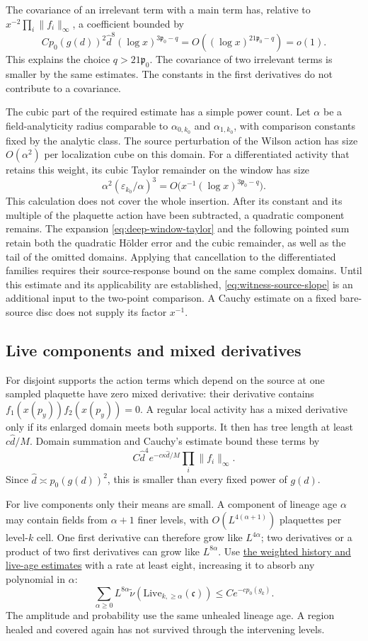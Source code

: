 \documentclass[11pt,letterpaper,reqno]{amsart}
\theoremstyle{definition}
\theoremstyle{remark}
\begin{document}
The covariance of an irrelevant term with a main term has, relative to
$x^{-2}\prod_i\|f_i\|_\infty$, a coefficient bounded by
\[
 Cp_0(g(d))^2\hat d^8(\log x)^{3\mathfrak p_0-q}
        =O((\log x)^{21\mathfrak p_0-q})=o(1).
\]
This explains the choice $q>21\mathfrak p_0$. The covariance of two
irrelevant terms is smaller by the same estimates. The constants in
the first derivatives do not contribute to a covariance.

The cubic part of the required estimate has a simple power count.
Let $\alpha$ be a field-analyticity radius comparable to
$\alpha_{0,k_0}$ and $\alpha_{1,k_0}$, with comparison constants
fixed by the analytic class. The source perturbation of the Wilson
action has size $O(\alpha^2)$ per localization cube on this domain.
For a differentiated activity that retains this weight, its cubic
Taylor remainder on the window has size
\[
 \alpha^2(\varepsilon_{k_0}/\alpha)^3
       =O\bigl(x^{-1}(\log x)^{3\mathfrak p_0-q}\bigr).
\]
This calculation does not cover the whole insertion. After its
constant and its multiple of the plaquette action have been
subtracted, a quadratic component remains. The expansion
\eqref{eq:deep-window-taylor} and the following pointed sum retain
both the quadratic H\"older error and the cubic remainder, as well
as the tail of the omitted domains.
Applying that cancellation to the differentiated families requires
their source-response bound on the same complex domains.
Until this estimate and its applicability are established,
\eqref{eq:witness-source-slope} is an additional input to the
two-point comparison. A Cauchy estimate on a fixed bare-source
disc does not supply its factor $x^{-1}$.

\subsection{Live components and mixed derivatives}

For disjoint supports the action terms which depend on the source at
one sampled plaquette have zero mixed derivative: their derivative
contains $f_1(x(p_y))f_2(x(p_y))=0$. A regular local activity has a
mixed derivative only if its enlarged domain meets both supports.
It then has tree length at least $c\hat d/M$. Domain summation and
Cauchy's estimate bound these terms by
\[
 C\hat d^4e^{-c\kappa\hat d/M}
                         \prod_i\|f_i\|_\infty.
\]
Since $\hat d\asymp p_0(g(d))^2$, this is smaller than every fixed
power of $g(d)$.

For live components only their means are small. A component of lineage
age $\alpha$ may contain fields from $\alpha+1$ finer levels, with
$O(L^{4(\alpha+1)})$ plaquettes per level-$k$ cell. One first
derivative can therefore grow like $L^{4\alpha}$; two derivatives
or a product of two first derivatives can grow like $L^{8\alpha}$.
Use \hyperref[hyp:history-bounds]{the weighted history and live-age estimates} with a rate at least eight, increasing it
to absorb any polynomial in $\alpha$:
\[
 \sum_{\alpha\ge0}L^{8\alpha}
    \widetilde\nu(\mathrm{Live}_{k,\ge\alpha}(\mathfrak c))
                      \le Ce^{-cp_0(g_k)}.
\]
The amplitude and probability use the same unhealed lineage age. A
region healed and covered again has not survived through the
intervening levels.
\end{document}

